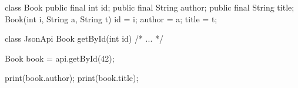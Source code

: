 \documentclass{article}
\begin{document}
\begin{lnSnippet}
class Book {
  public final int id;
  public final String author;
  public final String title;
  Book(int i, String a, String t)
    { id = i; author = a; title = t; }
}
\end{lnSnippet}
\begin{lnSnippet}
class JsonApi {
  Book getById(int id) { /* ... */ }
}

Book book = api.getById(42);

print(book.author);
print(book.title);
\end{lnSnippet}
\end{document}
